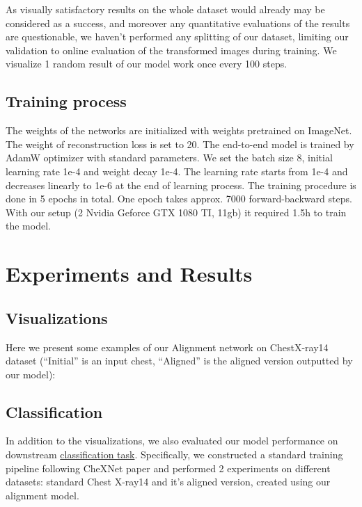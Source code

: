 \documentclass{article}
\begin{document}
As visually satisfactory results on the whole dataset would already may be 
considered as a success, and moreover any quantitative evaluations of the 
results are questionable, we haven't performed any splitting of our dataset, 
limiting our validation to online evaluation of the transformed images during 
training. We visualize 1 random result of our model work once every 100 steps.

\subsection{Training process}
The weights of the networks are initialized with weights pretrained on ImageNet. 
The weight of reconstruction loss is set to 20. The end-to-end model is trained 
by AdamW optimizer with standard parameters. We set the batch size 8, initial 
learning rate 1e-4 and weight decay 1e-4. The learning rate starts from 1e-4 
and decreases linearly to 1e-6 at the end of learning process. The training 
procedure is done in 5 epochs in total. One epoch takes approx. 7000 
forward-backward steps. With our setup (2 Nvidia Geforce GTX 1080 TI, 11gb) it 
required 1.5h to train the model.

\section{Experiments and Results}\label{experiments_and_results}

\subsection{Visualizations}

Here we present some examples of our Alignment network on ChestX-ray14 dataset 
 (``Initial'' is an input chest, ``Aligned'' is the aligned version outputted by our model):

\subsection{Classification}


In addition to the visualizations, we also evaluated our model performance 
on downstream \href{https://paperswithcode.com/sota/multi-label-classification-on-chestx-ray14}{classification task}. 
Specifically, we constructed a standard training pipeline following CheXNet 
paper \cite{CheXNet} and performed 2 experiments on different datasets: standard Chest X-ray14 
and it's aligned version, created using our alignment model.
\end{document}
